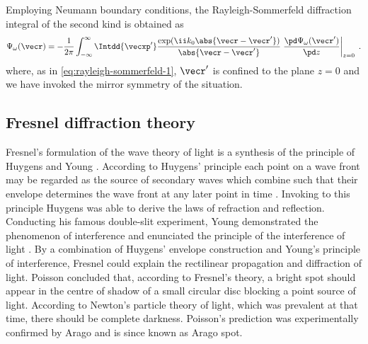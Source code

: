 \documentclass[
twoside,
openright,
titlepage,
numbers=noenddot,
headinclude,
fleqn,
a4paper,
footinclude=true,
cleardoublepage=empty,
abstractoff,
BCOR=5mm,
paper=a4,
fontsize=11pt,
british,ngerman,american,
]{scrreprt}
\begin{document}
Employing Neumann boundary conditions, the Rayleigh-Sommerfeld
diffraction integral of the second kind is obtained as
\begin{equation}
  \label{eq:rayleigh-sommerfeld-2}
  \Psi_\omega(\vecr) = -\frac{1}{2\pi}\int_{-\infty}^{\infty}\Intdd{\vecxp'}
   \frac{\exp(\ii k_0 \abs{\vecr-\vecr'})}{\abs{\vecr-\vecr'}}  
   \left.\frac{\pd\Psi_\omega(\vecr')}{\pd z}\right|_{z=0}   \;.
\end{equation}
where, as in \cref{eq:rayleigh-sommerfeld-1}, $\vecr'$ is confined to
the plane $z=0$ and we have invoked the mirror symmetry of the
situation.

\subsection{Fresnel diffraction theory}
\label{sec:fresnel}

Fresnel's formulation of the wave theory of light is a synthesis of
the principle of Huygens and Young \cite{BornWolf}.  According to
Huygens' principle each point on a wave front may be regarded as the
source of secondary waves which combine such that their envelope
determines the wave front at any later point in time
\cite{HuygensYoungFresnel}.  Invoking to this principle Huygens was
able to derive the laws of refraction and reflection.  Conducting his
famous double-slit experiment, Young demonstrated the phenomenon of
interference and enunciated %
the principle of the interference of light \cite{Young1802}.  By a
combination of Huygens' envelope construction and Young's principle of
interference, Fresnel could explain the rectilinear propagation and
diffraction of light.  Poisson concluded that, according to Fresnel's
theory, a bright spot should appear in the centre of shadow of a small
circular disc blocking a point source of light.  According to Newton's
particle theory of light, which was prevalent at that time, there
should be complete darkness.  Poisson's prediction was experimentally
confirmed by Arago and is since known as Arago spot.
\end{document}
